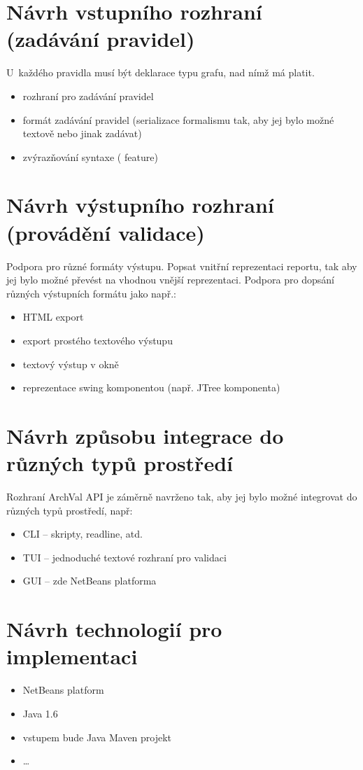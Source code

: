 \section{Návrh vstupního rozhraní (zadávání pravidel)}
U~každého pravidla musí být deklarace typu grafu, nad nímž má platit.
\begin{itemize}
\item rozhraní pro zadávání pravidel
\item formát zadávání pravidel (serializace formalismu tak, aby jej bylo možné textově nebo jinak zadávat)
\item zvýrazňování syntaxe ( feature)
\end{itemize}

\section{Návrh výstupního rozhraní (provádění validace)}
Podpora pro různé formáty výstupu. Popsat vnitřní reprezentaci reportu, tak aby jej bylo možné převést na vhodnou vnější reprezentaci. Podpora pro dopsání různých výstupních formátu jako např.:
\begin{itemize}
\item HTML export
\item export prostého textového výstupu
\item textový výstup v okně
\item reprezentace swing komponentou (např. JTree komponenta)
\end{itemize}

\section{Návrh způsobu integrace do různých typů prostředí}

Rozhraní ArchVal API je záměrně navrženo tak, aby jej bylo možné integrovat do různých typů prostředí, např:

\begin{itemize}
\item CLI -- skripty, readline, atd.
\item TUI -- jednoduché textové rozhraní pro validaci
\item GUI -- zde NetBeans platforma
\end{itemize}

\section{Návrh technologií pro implementaci}
\begin{itemize}
\item NetBeans platform
\item Java 1.6
\item vstupem bude Java Maven projekt
\item \ldots
\end{itemize}

